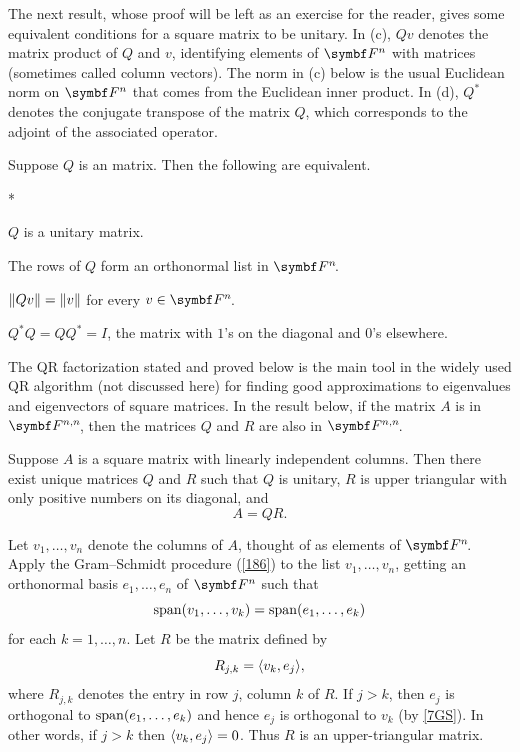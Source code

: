 The next result, whose proof will be left as an exercise for the reader, gives some equivalent conditions for a square matrix to be unitary. In (c), $Qv$ denotes the matrix product of $Q$ and $v$, identifying elements of $\F{n}$ with  matrices (sometimes called column vectors). The norm in (c) below is the usual Euclidean norm on $\F{n}$ that comes from the Euclidean inner product. In (d), $Q^*$ denotes the conjugate transpose of the matrix $Q$, which corresponds to the adjoint of the associated operator.

{Suppose $Q$ is an  matrix. Then the following are equivalent.
\begin{subtheorem}*
\item
$Q$ is a unitary matrix.
\item
The rows of $Q$ form an orthonormal list in $\FF{n}$.
\item
$\lVert Q v\rVert = \lVert v\rVert$ for every $v \in \FF{n}$.
\item
$Q^*Q = QQ^*= I$, the  matrix with $1$'s on the diagonal and $0$'s elsewhere.
\end{subtheorem}}

\pagebreak[3]

The QR factorization stated and proved below is the main tool in the widely used QR algorithm (not discussed here) for finding good approximations to \mbox{eigenvalues} and eigenvectors of square matrices. In the result below, if the matrix $A$ is in $\F{n,n}\!$, then the matrices $Q$ and $R$ are also in $\F{n,n}\!$.

{Suppose $A$ is a square matrix with linearly independent columns. Then there exist unique matrices $Q$ and $R$ such that $Q$ is unitary, $R$ is upper triangular with only positive numbers on its diagonal, and
\[
A = QR.
\]
}

\proof
Let $v_1, \ldots, v_n$ denote the columns of $A$, thought of as elements of $\FF{n}$. \mbox{Apply} the Gram--Schmidt procedure (\ref{186}) to the list $v_1, \ldots, v_n$, getting an orthonormal basis $e_1, \ldots, e_n$ of $\F{n}$ such that
\begin{equation} \label{7GS}
\operatorname{span}(v_1, \ldots, v_k) = \operatorname{span}(e_1, \ldots, e_k)
\end{equation}%
for each $k = 1, \ldots, n$. Let $R$ be the  matrix defined by
\[
R_{j,k} = \langle v_k, e_j\rangle,
\]
where $R_{j,k}$ denotes the entry in row $j$, column $k$ of $R$. If $j > k$, then $e_j$ is orthogonal to $\operatorname{span}(e_1, \ldots, e_k)$ and hence $e_j$ is orthogonal to $v_k$ (by \ref{7GS}). In other words, if
$j > k$ then $\langle v_k, e_j\rangle = 0$. Thus $R$ is an upper-triangular matrix.


